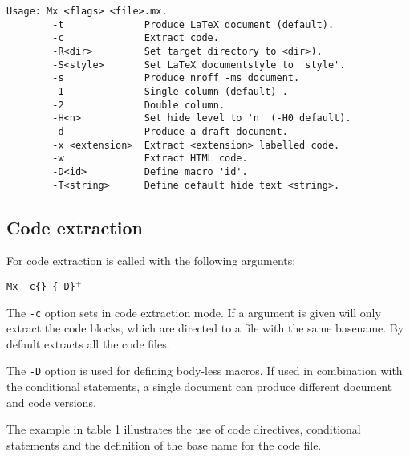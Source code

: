 \documentclass{article}
\begin{document}
\begin{verbatim}
Usage: Mx <flags> <file>.mx.
        -t              Produce LaTeX document (default).
        -c              Extract code.
        -R<dir>         Set target directory to <dir>).
        -S<style>       Set LaTeX documentstyle to 'style'.
        -s              Produce nroff -ms document.
        -1              Single column (default) .
        -2              Double column.
        -H<n>           Set hide level to 'n' (-H0 default).
        -d              Produce a draft document.
        -x <extension>  Extract <extension> labelled code.
        -w              Extract HTML code.
        -D<id>          Define macro 'id'.
        -T<string>      Define default hide text <string>.
\end{verbatim}

\subsection{Code extraction}

For code extraction \Mx is called with the following arguments:
\noindent
\begin{center}
        {\tt Mx -c\{\file\} \{-D\macro\}$^+$ \mxfile }
\end{center}

The {\tt -c} option sets \Mx in code extraction mode. If a \file
argument is given \Mx will only extract the code blocks, which are
directed to a file with the same basename. 
By default \Mx extracts all the code files. 

The {\tt -D\macro} option is used for defining body-less macros. If used in
combination with the conditional statements, a single \Mx document can
produce different document and code versions.

The example in table 1 illustrates the use of code directives,
conditional statements and the definition of the base name for the
code file.

\end{document}
